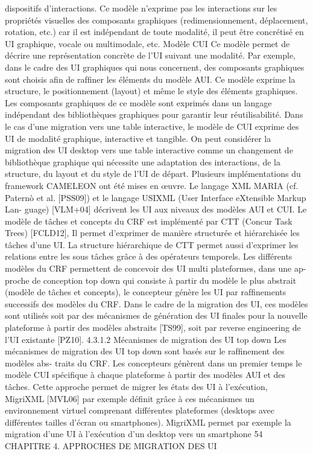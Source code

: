 \documentclass{article}
\begin{document}
dispositifs d’interactions. Ce modèle n’exprime pas les interactions sur les propriétés visuelles des
composants graphiques (redimensionnement, déplacement, rotation, etc.) car il est indépendant de
toute modalité, il peut être concrétisé en UI graphique, vocale ou multimodale, etc.
Modèle CUI
Ce modèle permet de décrire une représentation concrète de l’UI suivant une modalité.
Par exemple, dans le cadre des UI graphiques qui nous concernent, des composants graphiques sont
choisis aﬁn de rafﬁner les éléments du modèle AUI. Ce modèle exprime la structure, le positionnement
(layout) et même le style des éléments graphiques. Les composants graphiques de ce modèle sont
exprimés dans un langage indépendant des bibliothèques graphiques pour garantir leur réutilisabilité.
Dans le cas d’une migration vers une table interactive, le modèle de CUI exprime des UI de
modalité graphique, interactive et tangible. On peut considérer la migration des UI desktop vers une
table interactive comme un changement de bibliothèque graphique qui nécessite une adaptation des
interactions, de la structure, du layout et du style de l’UI de départ.
Plusieurs implémentations du framework CAMELEON ont été mises en œuvre. Le langage XML
MARIA (cf. Paternò et al. [PSS09]) et le langage USIXML (User Interface eXtensible Markup Lan-
guage) [VLM+04] décrivent les UI aux niveaux des modèles AUI et CUI. Le modèle de tâches et
concepts du CRF est implémenté par CTT (Concur Task Trees) [FCLD12], Il permet d’exprimer de
manière structurée et hiérarchisée les tâches d’une UI. La structure hiérarchique de CTT permet aussi
d’exprimer les relations entre les sous tâches grâce à des opérateurs temporels.
Les différents modèles du CRF permettent de concevoir des UI multi plateformes, dans une ap-
proche de conception top down qui consiste à partir du modèle le plus abstrait (modèle de tâches et
concepts), le concepteur génère les UI par rafﬁnements successifs des modèles du CRF. Dans le cadre
de la migration des UI, ces modèles sont utilisés soit par des mécanismes de génération des UI ﬁnales
pour la nouvelle plateforme à partir des modèles abstraits [TS99], soit par reverse engineering de l’UI
existante [PZ10].
4.3.1.2
Mécanismes de migration des UI top down
Les mécanismes de migration des UI top down sont basés sur le rafﬁnement des modèles abs-
traits du CRF. Les concepteurs génèrent dans un premier temps le modèle CUI spéciﬁque à chaque
plateforme à partir des modèles AUI et des tâches. Cette approche permet de migrer les états des UI
à l’exécution, MigriXML [MVL06] par exemple déﬁnit grâce à ces mécanismes un environnement
virtuel comprenant différentes plateformes (desktops avec différentes tailles d’écran ou smartphones).
MigriXML permet par exemple la migration d’une UI à l’exécution d’un desktop vers un smartphone
54
CHAPITRE 4. APPROCHES DE MIGRATION DES UI
 
\end{document}
